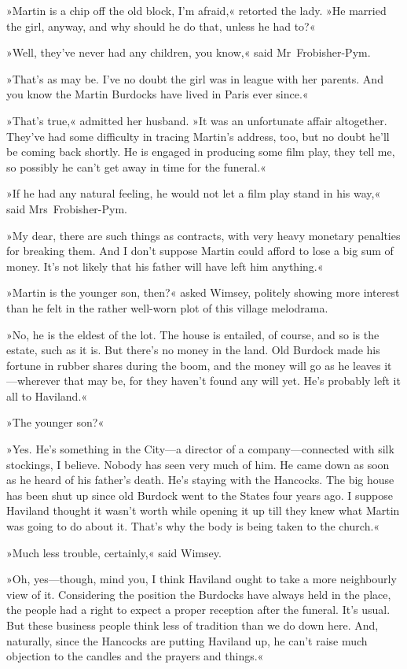 »Martin is a chip off the old block, I'm afraid,« retorted the lady. »He married the girl, anyway, and why should he do that, unless he had to?«

»Well, they've never had any children, you know,« said Mr~Frobisher-Pym.

»That's as may be. I've no doubt the girl was in league with her parents. And you know the Martin Burdocks have lived in Paris ever since.«

»That's true,« admitted her husband. »It was an unfortunate affair altogether. They've had some difficulty in tracing Martin's address, too, but no doubt he'll be coming back shortly. He is engaged in producing some film play, they tell me, so possibly he can't get away in time for the funeral.«

»If he had any natural feeling, he would not let a film play stand in his way,« said Mrs~Frobisher-Pym.

»My dear, there are such things as contracts, with very heavy monetary penalties for breaking them. And I don't suppose Martin could afford to lose a big sum of money. It's not likely that his father will have left him anything.«

»Martin is the younger son, then?« asked Wimsey, politely showing more interest than he felt in the rather well-worn plot of this village melodrama.

»No, he is the eldest of the lot. The house is entailed, of course, and so is the estate, such as it is. But there's no money in the land. Old Burdock made his fortune in rubber shares during the boom, and the money will go as he leaves it—wherever that may be, for they haven't found any will yet. He's probably left it all to Haviland.«

»The younger son?«

»Yes. He's something in the City—a director of a company—connected with silk stockings, I believe. Nobody has seen very much of him. He came down as soon as he heard of his father's death. He's staying with the Hancocks. The big house has been shut up since old Burdock went to the States four years ago. I suppose Haviland thought it wasn't worth while opening it up till they knew what Martin was going to do about it. That's why the body is being taken to the church.«

»Much less trouble, certainly,« said Wimsey.

»Oh, yes—though, mind you, I think Haviland ought to take a more neighbourly view of it. Considering the position the Burdocks have always held in the place, the people had a right to expect a proper reception after the funeral. It's usual. But these business people think less of tradition than we do down here. And, naturally, since the Hancocks are putting Haviland up, he can't raise much objection to the candles and the prayers and things.«

